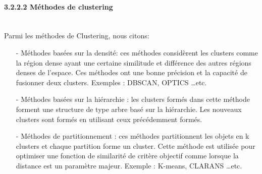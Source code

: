 \paragraph{{\large 3.2.2.2 Méthodes de clustering}\\\\}
Parmi les méthodes de Clustering, nous citons:\\
\begin{itemize}
\item[-]Méthodes basées sur la densité: ces méthodes considèrent les clusters comme la région dense ayant une certaine similitude et différence des autres régions denses de l'espace. Ces méthodes ont une bonne précision et la capacité de fusionner deux clusters. Exemples : DBSCAN, OPTICS …etc.\\
\item[-]Méthodes basées sur la hiérarchie : les clusters formés dans cette méthode forment une structure de type arbre basé sur la hiérarchie. Les nouveaux clusters sont formés en utilisant ceux précédemment formés.\\
\item[-]Méthodes de partitionnement : ces méthodes partitionnent les objets en k clusters et chaque partition forme un cluster. Cette méthode est utilisée pour optimiser une fonction de similarité de critère objectif comme lorsque la distance est un paramètre majeur. Exemple : K-means, CLARANS …etc.
\end{itemize}

